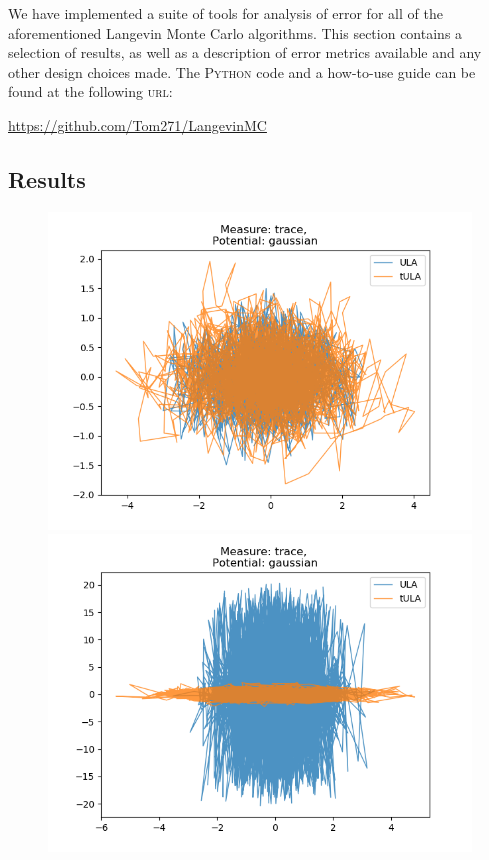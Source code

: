 We have implemented a suite of tools for analysis of error for all of the aforementioned Langevin Monte Carlo algorithms. This section contains a selection of results, as well as a description of error metrics available and any other design choices made. The \textsc{Python} code and a how-to-use guide can be found at the following
\textsc{url}: \\

   \centerline{ \url{https://github.com/Tom271/LangevinMC}}


\subsection{Results}

\begin{figure}[H]
\centering
  \begin{minipage}[b]{0.49\textwidth}
  \centering
    \includegraphics[width=\textwidth]{Figures/ula_tula_step_01.png}
  \end{minipage} %
  \begin{minipage}[b]{0.49\textwidth}
  \centering
    \includegraphics[width=\textwidth]{Figures/ula_tula_step_02.png}

\end{minipage}
\end{figure}
